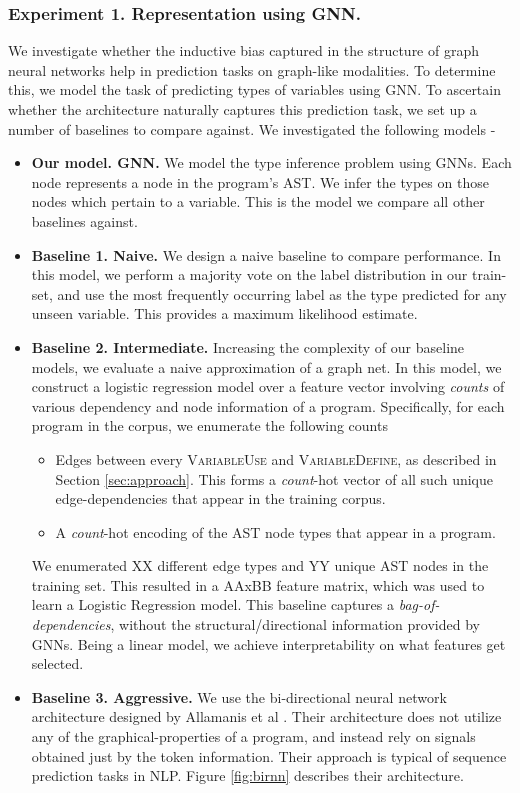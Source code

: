 \subsubsection{Experiment 1. Representation using GNN.}
We investigate whether the inductive bias captured in the structure of graph neural networks help in prediction tasks on graph-like modalities. To determine this, we model the task of predicting types of variables using GNN. To ascertain whether the architecture naturally captures this prediction task, we set up a number of baselines to compare against. We investigated the following models -
\begin{itemize}[noitemsep,topsep=0pt]
	\item \textbf{Our model. GNN.} We model the type inference problem using GNNs. Each node represents a node in the program's AST. We infer the types on those nodes which pertain to a variable. This is the model we compare all other baselines against.
	\item \textbf{Baseline 1. Naive.} We design a naive baseline to compare performance. In this model, we perform a majority vote on the label distribution in our train-set, and use the most frequently occurring label as the type predicted for any unseen variable. This provides a maximum likelihood estimate.
	\item \textbf{Baseline 2. Intermediate.} Increasing the complexity of our baseline models, we evaluate a naive approximation of a graph net. In this model, we construct a logistic regression model over a feature vector involving \textit{counts} of various dependency and node information of a program. Specifically, for each program in the corpus, we enumerate the following counts
	\begin{itemize}[noitemsep,topsep=0pt]
		\item Edges between every \textsc{VariableUse} and \textsc{VariableDefine}, as described in Section \ref{sec:approach}. This forms a \textit{count}-hot vector of all such unique edge-dependencies that appear in the training corpus.
		\item A  \textit{count}-hot encoding of the AST node types that appear in a program.
	\end{itemize}
	We enumerated XX different edge types and YY unique AST nodes in the training set. This resulted in a AAxBB feature matrix, which was used to learn a Logistic Regression model. This baseline captures a \textit{bag-of-dependencies}, without the structural/directional information provided by GNNs. Being a linear model, we achieve interpretability on what features get selected.
	\item \textbf{Baseline 3. Aggressive.} We use the bi-directional neural network architecture designed by Allamanis et al \cite{hellendoorn2018deep}. Their architecture does not utilize any of the graphical-properties of a program, and instead rely on signals obtained just by the token information. Their approach is typical of sequence prediction tasks in NLP. Figure \ref{fig:birnn} describes their architecture.
\end{itemize}
